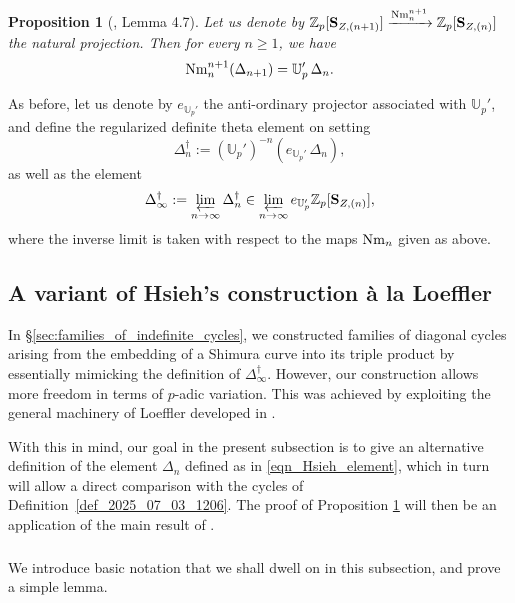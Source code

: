 \documentclass{amsart}
\numberwithin{equation}{section}
\newtheorem{proposition}[theorem]{Proposition}
\newcommand{\Zp}{\mathbb{Z}_p}
\begin{document}
\begin{proposition}[\cite{hsiehpadicbalanced}, Lemma 4.7]\label{Prop_of_Hsieh}
Let us denote by $\Zp[\mathbf{S}_{Z,(n+1)}] \xrightarrow{{\rm Nm}_{n}^{n+1} } \Zp[\mathbf{S}_{Z,(n)}]$ the natural projection. Then for every $n \geq 1$, we have  
\[ {\rm Nm}_{n}^{n+1}(\Delta_{n+1}) = \mathbb{U}_p' \,\Delta_{n} .\]
\end{proposition}

As before, let us denote by $e_{\mathbb{U}_p'}$ the anti-ordinary projector associated with $\mathbb{U}_p'$, and define the regularized definite theta element on setting
\[ \Delta^\dagger_n := (\mathbb{U}_p')^{-n} (e_{\mathbb{U}_p'} \, \Delta_{n}),\]
as well as the element 
\[ \Delta^\dagger_\infty := \varprojlim_{n \to \infty} \Delta^\dagger_n \in \varprojlim_{n \to \infty} e_{\mathbb{U}_p'}\Zp[\mathbf{S}_{Z,(n)}], \]
where the inverse limit is taken with respect to the maps ${\rm Nm}_{n}$ given as above.



\subsection{A variant of Hsieh's construction \`a la Loeffler}\label{subsec:Loefflerfamilyofthetaelements}
In \S\ref{sec:families_of_indefinite_cycles}, we constructed families of diagonal cycles arising from the embedding of a Shimura curve into its triple product by essentially mimicking the definition of $\Delta^\dagger_\infty$. However, our construction allows more freedom in terms of $p$-adic variation. This was achieved by exploiting the general machinery of Loeffler developed in \cite{LoefflerSpherical}. 

With this in mind, our goal in the present subsection is to give an alternative definition of the element $\Delta_n$ defined as in \eqref{eqn_Hsieh_element}, which in turn will allow a direct comparison with the cycles of Definition~\ref{def_2025_07_03_1206}. The proof of Proposition \ref{Prop_of_Hsieh} will then be an application of the main result of \cite{LoefflerSpherical}. 


\subsubsection{} We introduce basic notation that we shall dwell on in this subsection, and prove a simple lemma.
\end{document}
